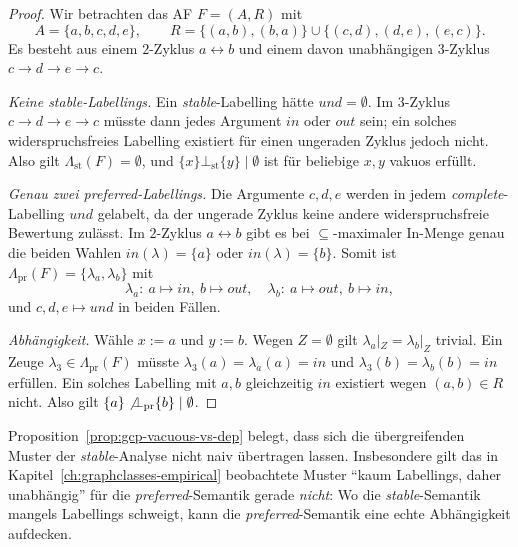 \begin{proof}
    Wir betrachten das AF \(F=(A,R)\) mit
    \[
        A=\{a,b,c,d,e\},\qquad
        R=\{(a,b),(b,a)\}\cup\{(c,d),(d,e),(e,c)\}.
    \]
    Es besteht aus einem \(2\)-Zyklus \(a\leftrightarrow b\) und einem davon
    unabh\"angigen \(3\)-Zyklus \(c\to d\to e\to c\).

    \emph{Keine \textit{stable}-Labellings.} Ein \textit{stable}-Labelling
    h\"atte \(\mathit{und}=\emptyset\). Im \(3\)-Zyklus \(c\to d\to e\to c\)
    m\"usste dann jedes Argument \(\mathit{in}\) oder \(\mathit{out}\) sein; ein
    solches widerspruchsfreies Labelling existiert f\"ur einen ungeraden Zyklus
    jedoch nicht. Also gilt \(\Lambda_{\mathrm{st}}(F)=\emptyset\), und
    \(\{x\}\bot_{\mathrm{st}}\{y\}\mid\emptyset\) ist f\"ur beliebige \(x,y\)
    vakuos erf\"ullt.

    \emph{Genau zwei \textit{preferred}-Labellings.} Die Argumente
    \(c,d,e\) werden in jedem \textit{complete}-Labelling \(\mathit{und}\)
    gelabelt, da der ungerade Zyklus keine andere widerspruchsfreie Bewertung
    zul\"asst. Im \(2\)-Zyklus \(a\leftrightarrow b\) gibt es bei
    \(\subseteq\)-maximaler In-Menge genau die beiden Wahlen
    \(\mathit{in}(\lambda)=\{a\}\) oder \(\mathit{in}(\lambda)=\{b\}\). Somit
    ist \(\Lambda_{\mathrm{pr}}(F)=\{\lambda_a,\lambda_b\}\) mit
    \[
        \lambda_a:\ a\mapsto\mathit{in},\ b\mapsto\mathit{out},\quad
        \lambda_b:\ a\mapsto\mathit{out},\ b\mapsto\mathit{in},
    \]
    und \(c,d,e\mapsto\mathit{und}\) in beiden F\"allen.

    \emph{Abh\"angigkeit.} W\"ahle \(x:=a\) und \(y:=b\). Wegen
    \(Z=\emptyset\) gilt \(\lambda_a|_Z=\lambda_b|_Z\) trivial. Ein Zeuge
    \(\lambda_3\in\Lambda_{\mathrm{pr}}(F)\) m\"usste
    \(\lambda_3(a)=\lambda_a(a)=\mathit{in}\) und
    \(\lambda_3(b)=\lambda_b(b)=\mathit{in}\) erf\"ullen. Ein solches Labelling
    mit \(a,b\) gleichzeitig \(\mathit{in}\) existiert wegen \((a,b)\in R\)
    nicht. Also gilt \(\{a\}\not\bot_{\mathrm{pr}}\{b\}\mid\emptyset\).
\end{proof}

Proposition~\ref{prop:gcp-vacuous-vs-dep} belegt, dass sich die
\"ubergreifenden Muster der \textit{stable}-Analyse nicht naiv \"ubertragen
lassen. Insbesondere gilt das in Kapitel~\ref{ch:graphclasses-empirical}
beobachtete Muster \enquote{kaum Labellings, daher unabh\"angig} f\"ur die
\textit{preferred}-Semantik gerade \emph{nicht}: Wo die \textit{stable}-Semantik
mangels Labellings schweigt, kann die \textit{preferred}-Semantik eine echte
Abh\"angigkeit aufdecken.

